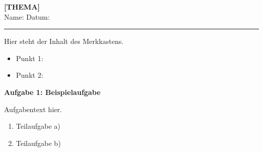 \documentclass[11pt,a4paper]{article}
\newcommand{\luecke}[1]{\underline{\hspace{#1}}}
\newcommand{\aufgabe}[1]{\noindent\textbf{\textcolor{fachfarbe}{#1}}}
\begin{document}
\begin{center}
    {\Large\bfseries [THEMA]}\\[0.2em]
    {\small Name: \luecke{5cm} \hfill Datum: \luecke{3cm}}
\end{center}
\vspace{0.2em}
\hrule
\vspace{0.8em}

\begin{merkkasten}[title=Kasten 1: Beispiel-Merksatz]
Hier steht der Inhalt des Merkkastens.
\begin{itemize}[leftmargin=*, itemsep=3pt, topsep=0pt]
    \item Punkt 1: \luecke{3cm}
    \item Punkt 2: \luecke{3cm}
\end{itemize}
\end{merkkasten}

\vspace{0.6em}

\aufgabe{Aufgabe 1: Beispielaufgabe}

\vspace{0.3em}
\noindent Aufgabentext hier.

\vspace{0.5em}
\begin{enumerate}[label=\alph*), leftmargin=1.5em, itemsep=0.6em]
    \item Teilaufgabe a) \luecke{2cm}
    \item Teilaufgabe b) \luecke{2cm}
\end{enumerate}
\end{document}
